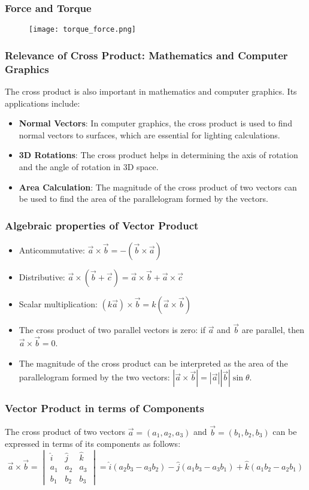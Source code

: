 \begin{frame}
    \frametitle{Force and Torque} 
    \begin{figure}
        \texttt{[image: torque\_force.png]}
    \end{figure}
\end{frame}

\begin{frame}
    \frametitle{Relevance of Cross Product: Mathematics and Computer Graphics}
    The cross product is also important in mathematics and computer graphics. Its applications include:
    \begin{itemize}
        \item \textbf{Normal Vectors}: In computer graphics, the cross product is used to find normal vectors to surfaces, which are essential for lighting calculations.
        \item \textbf{3D Rotations}: The cross product helps in determining the axis of rotation and the angle of rotation in 3D space.
        \item \textbf{Area Calculation}: The magnitude of the cross product of two vectors can be used to find the area of the parallelogram formed by the vectors.
    \end{itemize}
\end{frame}

\begin{frame}
    \frametitle{Algebraic properties of Vector Product}
    \begin{itemize}
        \item Anticommutative: \(\vec{a} \times \vec{b} = -(\vec{b} \times \vec{a})\)
        \item Distributive: \(\vec{a} \times (\vec{b} + \vec{c}) = \vec{a} \times \vec{b} + \vec{a} \times \vec{c}\)
        \item Scalar multiplication: \((k \vec{a}) \times \vec{b} = k (\vec{a} \times \vec{b})\)
        \item The cross product of two parallel vectors is zero: if \(\vec{a}\) and \(\vec{b}\) are parallel, then \(\vec{a} \times \vec{b} = 0\).
        \item The magnitude of the cross product can be interpreted as the area of the parallelogram formed by the two vectors: \(|\vec{a} \times \vec{b}| = |\vec{a}| |\vec{b}| \sin \theta\).
    \end{itemize}
\end{frame}

\begin{frame}
\frametitle{Vector Product in terms of Components}
The cross product of two vectors \(\vec{a} = (a_1, a_2, a_3)\) and \(\vec{b} = (b_1, b_2, b_3)\) can be expressed in terms of its components as follows:
\[
\vec{a} \times \vec{b} = \begin{vmatrix}
\hat{i} & \hat{j} & \hat{k} \\
a_1 & a_2 & a_3 \\
b_1 & b_2 & b_3
\end{vmatrix}
= \hat{i}(a_2b_3 - a_3b_2) - \hat{j}(a_1b_3 - a_3b_1) + \hat{k}(a_1b_2 - a_2b_1)
\]
\end{frame}

